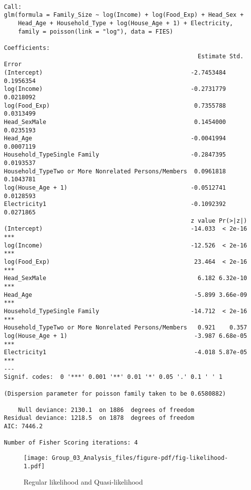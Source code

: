 \documentclass[
]{article}
\begin{document}
\begin{verbatim}

Call:
glm(formula = Family_Size ~ log(Income) + log(Food_Exp) + Head_Sex + 
    Head_Age + Household_Type + log(House_Age + 1) + Electricity, 
    family = poisson(link = "log"), data = FIES)

Coefficients:
                                                       Estimate Std. Error
(Intercept)                                          -2.7453484  0.1956354
log(Income)                                          -0.2731779  0.0218092
log(Food_Exp)                                         0.7355788  0.0313499
Head_SexMale                                          0.1454000  0.0235193
Head_Age                                             -0.0041994  0.0007119
Household_TypeSingle Family                          -0.2847395  0.0193537
Household_TypeTwo or More Nonrelated Persons/Members  0.0961818  0.1043781
log(House_Age + 1)                                   -0.0512741  0.0128593
Electricity1                                         -0.1092392  0.0271865
                                                     z value Pr(>|z|)    
(Intercept)                                          -14.033  < 2e-16 ***
log(Income)                                          -12.526  < 2e-16 ***
log(Food_Exp)                                         23.464  < 2e-16 ***
Head_SexMale                                           6.182 6.32e-10 ***
Head_Age                                              -5.899 3.66e-09 ***
Household_TypeSingle Family                          -14.712  < 2e-16 ***
Household_TypeTwo or More Nonrelated Persons/Members   0.921    0.357    
log(House_Age + 1)                                    -3.987 6.68e-05 ***
Electricity1                                          -4.018 5.87e-05 ***
---
Signif. codes:  0 '***' 0.001 '**' 0.01 '*' 0.05 '.' 0.1 ' ' 1

(Dispersion parameter for poisson family taken to be 0.6580882)

    Null deviance: 2130.1  on 1886  degrees of freedom
Residual deviance: 1218.5  on 1878  degrees of freedom
AIC: 7446.2

Number of Fisher Scoring iterations: 4
\end{verbatim}

\begin{figure}[H]

{\centering \texttt{[image: Group\_03\_Analysis\_files/figure-pdf/fig-likelihood-1.pdf]}

}

\caption{\label{fig-likelihood}Regular likelihood and Quasi-likelihood}

\end{figure}
\end{document}
